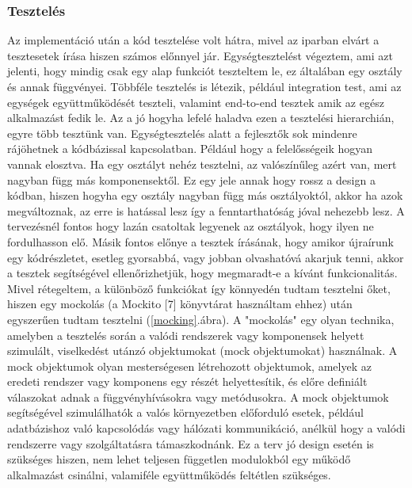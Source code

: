 \documentclass[a4paper,twoside]{article}
\begin{document}
\subsubsection{Tesztelés}
Az implementáció után a kód tesztelése volt hátra, mivel az iparban elvárt a tesztesetek írása hiszen számos előnnyel jár.
Egységtesztelést végeztem, ami azt jelenti, hogy mindig csak egy alap funkciót teszteltem le, ez általában egy osztály és annak függvényei. Többféle tesztelés is létezik, például integration test, ami az egységek együttműködését teszteli, valamint end-to-end tesztek amik az egész alkalmazást fedik le. Az a jó hogyha lefelé haladva ezen a tesztelési hierarchián, egyre több tesztünk van. Egységtesztelés 
alatt a fejlesztők sok mindenre rájöhetnek a kódbázissal kapcsolatban. Például hogy a felelősségeik hogyan vannak elosztva. Ha egy osztályt nehéz tesztelni, az valószínűleg azért van, mert nagyban függ más komponensektől. Ez egy jele annak hogy rossz a design a kódban, hiszen hogyha egy osztály nagyban függ más osztályoktól, akkor ha azok megváltoznak, az erre is hatással lesz így a fenntarthatóság jóval nehezebb lesz. A tervezésnél fontos hogy lazán csatoltak legyenek az osztályok, hogy ilyen ne fordulhasson elő. Másik fontos előnye a tesztek írásának, hogy amikor újraírunk egy kódrészletet, esetleg gyorsabbá, vagy jobban olvashatóvá akarjuk tenni, akkor a tesztek segítségével ellenőrizhetjük, hogy megmaradt-e a kívánt funkcionalitás.  Mivel rétegeltem, a különböző funkciókat így könnyedén tudtam tesztelni őket, hiszen
egy mockolás (a Mockito [7] könyvtárat használtam ehhez) után egyszerűen tudtam tesztelni (\ref{mocking}.ábra).
A "mockolás" egy olyan technika, amelyben a tesztelés során a valódi rendszerek vagy
komponensek helyett szimulált, viselkedést utánzó objektumokat (mock objektumokat) használnak.
A mock objektumok olyan mesterségesen létrehozott objektumok, amelyek az
eredeti rendszer vagy komponens egy részét helyettesítik, és előre definiált válaszokat adnak a
függvényhívásokra vagy metódusokra. A mock objektumok segítségével szimulálhatók a
valós környezetben előforduló esetek, például adatbázishoz való kapcsolódás vagy hálózati
kommunikáció, anélkül hogy a valódi rendszerre vagy szolgáltatásra támaszkodnánk. Ez a terv jó design esetén is szükséges hiszen, nem lehet teljesen független modulokból egy működő alkalmazást csinálni, valamiféle együttműködés feltétlen szükséges. 
\end{document}
